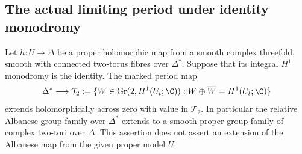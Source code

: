\subsection{The actual limiting period under identity monodromy}

\begin{proposition}
\label{st:D.2.6}
Let $h:U\to\Delta$ be a proper holomorphic map from a smooth
complex threefold, smooth with connected two-torus fibres over
$\Delta^*$. Suppose that its integral $H^1$ monodromy is the
identity. The marked period map
\[
 \Delta^*\longrightarrow
 \mathcal T_2
 :=\{W\in\operatorname{Gr}(2,H^1(U_t;\C)):
                   W\oplus\overline W=H^1(U_t;\C)\}
\]
extends holomorphically across zero with value in $\mathcal T_2$.
In particular the relative Albanese group family over $\Delta^*$
extends to a smooth proper group family of complex two-tori over
$\Delta$. This assertion does not assert an extension of the
Albanese map from the given proper model $U$.
\end{proposition}
